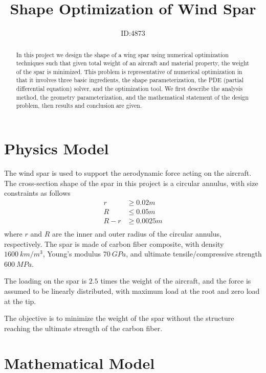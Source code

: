 \documentclass[a4paper]{article}
\title{Shape Optimization of Wind Spar}
\author{ID:4873}
\begin{document}
 \maketitle
 
\begin{abstract}
   In this project we design the shape of a wing spar using numerical optimization techniques such that given total weight of an aircraft and material property, the weight of the spar is minimized. This problem is representative of numerical optimization in that it involves three basic ingredients, the shape parameterization, the PDE (partial differential equation) solver, and the optimization tool. We first describe the analysis method, the geometry parameterization, and the mathematical statement of the design problem, then results and conclusion are given.
\end{abstract}

\section{Physics Model} \label{sec:physics}
The wind spar is used to support the aerodynamic force acting on the aircraft. The cross-section shape of the spar in this project is a circular annulus, with size constraints as follows
\begin{equation}
\begin{aligned}
r &\ge 0.02m \\
R &\le 0.05m \\
R-r &\ge 0.0025m\\
\end{aligned}
\end{equation}
where $r$ and $R$ are the inner and outer radius of the circular annulus, respectively.
The spar is made of carbon fiber composite, with density $1600\:km/m^3$, Young's modulus $70\:GPa$, and ultimate tensile/compressive strength $600\: MPa$.

The loading on the spar is $2.5$ times the weight of the aircraft, and the force is assumed to be linearly distributed, with maximum load at the root and zero load at the tip.

The objective is to minimize the weight of the spar without the structure reaching the ultimate strength of the carbon fiber. 
\section{Mathematical Model}
\end{document}
